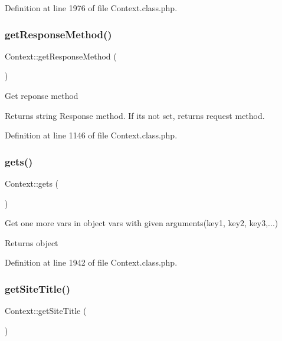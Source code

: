 Definition at line 1976 of file Context.\+class.\+php.

\hypertarget{classContext_a1d02a15209360034cd719d8b08cb5061}{}\label{classContext_a1d02a15209360034cd719d8b08cb5061} 
\subsubsection{\texorpdfstring{get\+Response\+Method()}{getResponseMethod()}}
{\footnotesize\ttfamily Context\+::get\+Response\+Method (\begin{DoxyParamCaption}{ }\end{DoxyParamCaption})}

Get reponse method

\begin{DoxyReturn}{Returns}
string Response method. If it\textquotesingle{}s not set, returns request method. 
\end{DoxyReturn}


Definition at line 1146 of file Context.\+class.\+php.

\hypertarget{classContext_ae906c0b1533a8e4ce7836d3665b46288}{}\label{classContext_ae906c0b1533a8e4ce7836d3665b46288} 
\subsubsection{\texorpdfstring{gets()}{gets()}}
{\footnotesize\ttfamily Context\+::gets (\begin{DoxyParamCaption}{ }\end{DoxyParamCaption})}

Get one more vars in object vars with given arguments(key1, key2, key3,...)

\begin{DoxyReturn}{Returns}
object 
\end{DoxyReturn}


Definition at line 1942 of file Context.\+class.\+php.

\hypertarget{classContext_a0ee79330d3ee12c811cd784e24a7b017}{}\label{classContext_a0ee79330d3ee12c811cd784e24a7b017} 
\subsubsection{\texorpdfstring{get\+Site\+Title()}{getSiteTitle()}}
{\footnotesize\ttfamily Context\+::get\+Site\+Title (\begin{DoxyParamCaption}{ }\end{DoxyParamCaption})}


